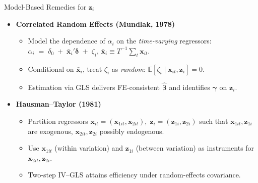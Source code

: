 \documentclass[aspectratio=169, handout, t]{beamer}
\numberwithin{equation}{section}
\begin{document}
\begin{frame}{Model-Based Remedies for $\bm{z}_{i}$}
\begin{itemize}
  \item \textbf{Correlated Random Effects (Mundlak, 1978)}
    \begin{itemize}
      \item Model the dependence of $\alpha_i$ on the \emph{time-varying} regressors:
            $\displaystyle \alpha_i \;=\;
              \delta_0 \;+\; \bar{\bm{x}}_{i}'\bm{\delta} \;+\; \zeta_i$,
            \quad $\bar{\bm{x}}_{i}\equiv T^{-1}\!\sum_{t}\bm{x}_{it}$.
      \item Conditional on $\bar{\bm{x}}_{i}$, treat $\zeta_i$ as \emph{random}:
            $\mathbb{E}[\zeta_i\mid\bm{x}_{it},\bm{z}_{i}]=0$.
      \item Estimation via GLS delivers FE-consistent
            $\hat{\bm{\beta}}$ and identifies $\bm{\gamma}$ on $\bm{z}_i$.
    \end{itemize}\pause
  \item \textbf{Hausman--Taylor (1981)}
    \begin{itemize}
      \item Partition regressors
        $\bm{x}_{it}=(\bm{x}_{1it},\bm{x}_{2it}),\;
         \bm{z}_{i}=(\bm{z}_{1i},\bm{z}_{2i})$
        such that
        \(
          \bm{x}_{1it},\bm{z}_{1i}
        \) are exogenous,
        \(
          \bm{x}_{2it},\bm{z}_{2i}
        \) possibly endogenous.
      \item Use \(\bm{x}_{1it}\) (within variation) and \(\bm{z}_{1i}\)
            (between variation) as instruments for \(\bm{x}_{2it},\bm{z}_{2i}\).
      \item Two-step IV--GLS attains efficiency under random-effects covariance.
    \end{itemize}
\end{itemize}
\end{frame}
\end{document}
